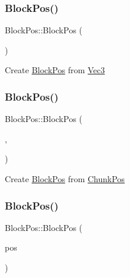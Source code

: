 \subsubsection{\texorpdfstring{BlockPos()}{BlockPos()}\hspace{0.1cm}{\footnotesize\ttfamily [1/3]}}
{\footnotesize\ttfamily Block\+Pos\+::\+Block\+Pos (\begin{DoxyParamCaption}\item[{\mbox{\hyperlink{struct_vec3}{Vec3}} const \&}]{ }\end{DoxyParamCaption})}

Create \mbox{\hyperlink{struct_block_pos}{Block\+Pos}} from \mbox{\hyperlink{struct_vec3}{Vec3}} \mbox{\label{struct_block_pos_a91b87da862d24ecb05ac2d9384037059}} 
\subsubsection{\texorpdfstring{BlockPos()}{BlockPos()}\hspace{0.1cm}{\footnotesize\ttfamily [2/3]}}
{\footnotesize\ttfamily Block\+Pos\+::\+Block\+Pos (\begin{DoxyParamCaption}\item[{\mbox{\hyperlink{struct_chunk_pos}{Chunk\+Pos}} const \&}]{,  }\item[{int}]{ }\end{DoxyParamCaption})}

Create \mbox{\hyperlink{struct_block_pos}{Block\+Pos}} from \mbox{\hyperlink{struct_chunk_pos}{Chunk\+Pos}} \mbox{\label{struct_block_pos_a30b79b2378deb9777057d0290cc414c2}} 
\subsubsection{\texorpdfstring{BlockPos()}{BlockPos()}\hspace{0.1cm}{\footnotesize\ttfamily [3/3]}}
{\footnotesize\ttfamily Block\+Pos\+::\+Block\+Pos (\begin{DoxyParamCaption}\item[{\mbox{\hyperlink{struct_block_pos}{Block\+Pos}} const \&}]{pos }\end{DoxyParamCaption})\hspace{0.3cm}{\ttfamily [inline]}}


